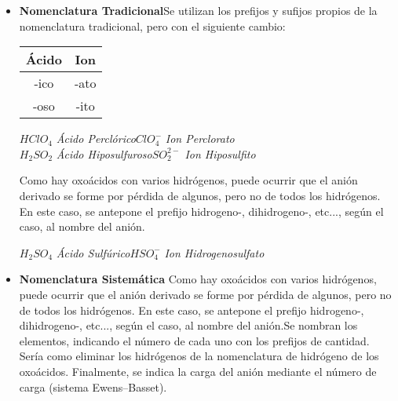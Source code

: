 \begin{itemize}
	\item\textbf{Nomenclatura Tradicional}Se utilizan los prefijos y sufijos propios de la nomenclatura tradicional, pero con el siguiente cambio:
	\begin{table}[h!]
		\centering
		\begin{tabular}{c|c}
			Ácido&Ion\\ \hline
			-ico&-ato\\
			-oso&-ito\\ \hline
		\end{tabular}
	\end{table}

\begin{center}
	$HClO_4$ \hspace{0.3cm}\textit{Ácido Perclórico}\hspace{1cm}$ClO_{4}^{-}$ \hspace{0.3cm} \textit{Ion Perclorato}\\
	$H_2SO_2$ \hspace{0.3cm}\textit{Ácido Hiposulfuroso}\hspace{1cm}$SO_{2}^{2-}$ \hspace{0.3cm} \textit{Ion Hiposulfito}\\
\end{center}
	Como hay oxoácidos con varios hidrógenos, puede ocurrir que el anión derivado se forme por pérdida de algunos, pero no de todos los hidrógenos. En este caso, se antepone el prefijo hidrogeno-, dihidrogeno-, etc..., según el caso, al nombre del anión.	
\begin{center}
	$H_2SO_4$ \hspace{0.3cm}\textit{Ácido Sulfúrico}\hspace{1cm}$HSO_{4}^{-}$ \hspace{0.3cm} \textit{Ion Hidrogenosulfato}\\
\end{center}
	\item\textbf{Nomenclatura Sistemática} Como hay oxoácidos con varios hidrógenos, puede ocurrir que el anión derivado se forme por pérdida de algunos, pero no de todos los hidrógenos. En este caso, se antepone el prefijo hidrogeno-, dihidrogeno-, etc..., según el caso, al nombre del anión.Se nombran los elementos, indicando el número de cada uno con los prefijos de cantidad. Sería como eliminar los hidrógenos de la nomenclatura de hidrógeno de los oxoácidos. Finalmente, se indica la carga del anión mediante el número de carga (sistema Ewens–Basset).

\end{itemize}
